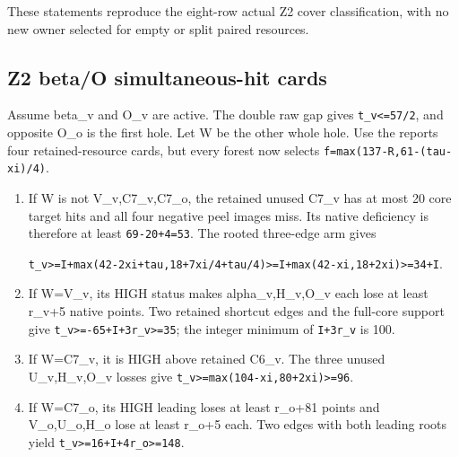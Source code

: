 \documentclass[10pt,a4paper]{article}
\theoremstyle{definition}
\begin{document}
These statements reproduce the eight-row actual Z2 cover classification,\allowbreak{}
with no new owner selected for empty or split paired resources.

\hypertarget{z2-betao-simultaneous-hit-cards}{%
\subsection{Z2 beta/O simultaneous-hit
cards}\label{z2-betao-simultaneous-hit-cards}}

Assume beta\_\allowbreak{}v and O\_\allowbreak{}v are active. The double raw gap gives
\texttt{t\_\allowbreak{}\allowbreak{}v<=\allowbreak{}57/\allowbreak{}2},\allowbreak{} and opposite O\_\allowbreak{}o is the first
hole. Let W be the other whole hole. Use the report\textquotesingle s
four retained-resource cards,\allowbreak{} but every forest now selects
\texttt{f=\allowbreak{}max(137-R,\allowbreak{}61-(tau-xi)/\allowbreak{}4)}.

\begin{enumerate}
\def\labelenumi{\arabic{enumi}.}
\item
  If W is not V\_\allowbreak{}v,\allowbreak{}C7\_\allowbreak{}v,\allowbreak{}C7\_\allowbreak{}o,\allowbreak{} the retained unused C7\_\allowbreak{}v has at most 20
  core target hits and all four negative peel images miss. Its native
  deficiency is therefore at least \texttt{69-20+\allowbreak{}4=\allowbreak{}53}.
  The rooted three-edge arm gives

  \texttt{t\_\allowbreak{}\allowbreak{}v>=\allowbreak{}I+\allowbreak{}max(42-2xi+\allowbreak{}tau,\allowbreak{}18+\allowbreak{}7xi/\allowbreak{}4+\allowbreak{}tau/\allowbreak{}4)>=\allowbreak{}I+\allowbreak{}max(42-xi,\allowbreak{}18+\allowbreak{}2xi)>=\allowbreak{}34+\allowbreak{}I}.
\item
  If W=\allowbreak{}V\_\allowbreak{}v,\allowbreak{} its HIGH status makes alpha\_\allowbreak{}v,\allowbreak{}H\_\allowbreak{}v,\allowbreak{}O\_\allowbreak{}v each lose at least
  r\_\allowbreak{}v+\allowbreak{}5 native points. Two retained shortcut edges and the full-core
  support give \texttt{t\_\allowbreak{}\allowbreak{}v>=\allowbreak{}-65+\allowbreak{}I+\allowbreak{}3r\_\allowbreak{}\allowbreak{}v>=\allowbreak{}35}; the
  integer minimum of \texttt{I+\allowbreak{}3r\_\allowbreak{}\allowbreak{}v} is 100.
\item
  If W=\allowbreak{}C7\_\allowbreak{}v,\allowbreak{} it is HIGH above retained C6\_\allowbreak{}v. The three unused
  U\_\allowbreak{}v,\allowbreak{}H\_\allowbreak{}v,\allowbreak{}O\_\allowbreak{}v losses give
  \texttt{t\_\allowbreak{}\allowbreak{}v>=\allowbreak{}max(104-xi,\allowbreak{}80+\allowbreak{}2xi)>=\allowbreak{}96}.
\item
  If W=\allowbreak{}C7\_\allowbreak{}o,\allowbreak{} its HIGH leading loses at least r\_\allowbreak{}o+\allowbreak{}81 points and
  V\_\allowbreak{}o,\allowbreak{}U\_\allowbreak{}o,\allowbreak{}H\_\allowbreak{}o lose at least r\_\allowbreak{}o+\allowbreak{}5 each. Two edges with both leading
  roots yield \texttt{t\_\allowbreak{}\allowbreak{}v>=\allowbreak{}16+\allowbreak{}I+\allowbreak{}4r\_\allowbreak{}\allowbreak{}o>=\allowbreak{}148}.
\end{enumerate}
\end{document}
